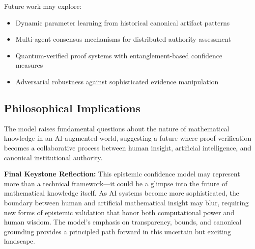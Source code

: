 \documentclass[12pt,a4paper]{article}
\theoremstyle{definition}
\theoremstyle{remark}
\begin{document}
Future work may explore:
\begin{itemize}
    \item Dynamic parameter learning from historical canonical artifact patterns
    \item Multi-agent consensus mechanisms for distributed authority assessment
    \item Quantum-verified proof systems with entanglement-based confidence measures
    \item Adversarial robustness against sophisticated evidence manipulation
\end{itemize}

\subsection{Philosophical Implications}

The model raises fundamental questions about the nature of mathematical knowledge in an AI-augmented world, suggesting a future where proof verification becomes a collaborative process between human insight, artificial intelligence, and canonical institutional authority.

\begin{reflectionbox}
\textbf{Final Keystone Reflection:} This epistemic confidence model may represent more than a technical framework—it could be a glimpse into the future of mathematical knowledge itself. As AI systems become more sophisticated, the boundary between human and artificial mathematical insight may blur, requiring new forms of epistemic validation that honor both computational power and human wisdom. The model's emphasis on transparency, bounds, and canonical grounding provides a principled path forward in this uncertain but exciting landscape.
\end{reflectionbox}



\end{document}
